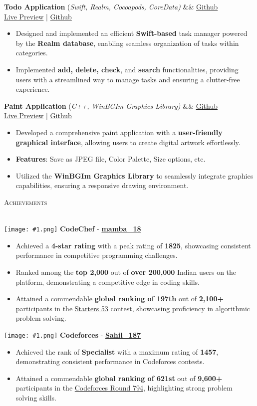 \documentclass[a4paper]{article}
\newcommand{\tinyBulletSep} { \vspace{1.2mm} }
\newcommand{\bulletSep} { \vspace{2.2mm} }
\newcommand{\sectionSep} { \vspace{3mm} }
\newcommand{\lineunder} {
    \vspace*{-8pt} \\
    \hspace*{-15pt} \hrulefill \\
}
\newcommand{\header} [1] {
    {\hspace*{-18pt}\vspace*{6pt} {
        \fontfamily{qcs}\selectfont \large \scshape #1
    }}
    \vspace*{-6pt} \lineunder
    \vspace{0.5mm}
}
\newcommand{\projectItem}[5]{
    {\textbf{#1}} {(\sl #2)}\hfill
    \ifx&#3&%
    \href{#4}{Github}\\
    \else
    \href{#3}{Live Preview} | \href{#4}{Github}\\
    \fi
    \begin{itemize}
        #5
    \end{itemize}
}
\newcommand{\image}[1]{
    \begingroup\normalfont
    \Large
    \texttt{[image: \#1.png]}%
    \endgroup
}
\begin{document}
\projectItem{Todo Application}{Swift, Realm, Cocoapods, CoreData}{}{https://github.com/Sahil-187/Todo-Application.git}{
    \item Designed and implemented an efficient \textbf{Swift-based} task manager powered by the \textbf{Realm database}, enabling seamless organization of tasks within categories.
    \item Implemented \textbf{add, delete, check}, and \textbf{search} functionalities, providing users with a streamlined way to manage tasks and ensuring a clutter-free experience.
}

\bulletSep

\projectItem{Paint Application}{C++, WinBGIm Graphics Library}{}{https://github.com/Sahil-187/Paint-Application}{
    \item Developed a comprehensive paint application with a \textbf{user-friendly graphical interface}, allowing users to create digital artwork effortlessly.
    \item \textbf{Features}: Save as JPEG file, Color Palette, Size options, etc.
    \item Utilized the \textbf{WinBGIm Graphics Library} to seamlessly integrate graphics capabilities, ensuring a responsive drawing environment.
}
\sectionSep

\header{Achievements}
\image{cc} \textbf{CodeChef} - \textbf{\href{https://www.codechef.com/users/mamba_18}{mamba\_18}}
\begin{itemize}
    \item Achieved a \textbf{4-star rating} with a peak rating of \textbf{1825}, showcasing consistent performance in competitive programming challenges.
    \item Ranked among the \textbf{top 2,000} out of \textbf{over 200,000} Indian users on the platform, demonstrating a competitive edge in coding skills.
    \item Attained a commendable \textbf{global ranking of 197th} out of \textbf{2,100+} participants in the \href{https://www.codechef.com/rankings/START53B?itemsPerPage=100&order=asc&page=1&search=mamba_18&sortBy=rank}{Starters 53} contest, showcasing proficiency in algorithmic problem solving.
\end{itemize}
\tinyBulletSep

\image{cf} \textbf{Codeforces} - \textbf{\href{https://codeforces.com/profile/Sahil_187}{Sahil\_187}}
\begin{itemize}
    \item Achieved the rank of \textbf{Specialist} with a maximum rating of \textbf{1457}, demonstrating consistent performance in Codeforces contests.
    \item Attained a commendable \textbf{global ranking of 621st} out of \textbf{9,600+} participants in the \href{https://codeforces.com/contest/1686/standings/participant/133631879\#p133631879}{Codeforces Round 794}, highlighting strong problem solving skills.
\end{itemize}
\tinyBulletSep
\end{document}
